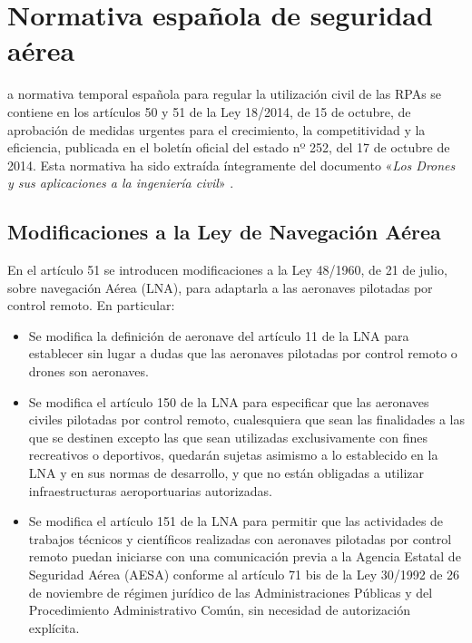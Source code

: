 \chapter{Normativa española de seguridad aérea}
\label{chap:normativa}

a normativa temporal española para regular la utilización civil de las \acs{RPA}s se contiene en los artículos 50 y 51 de la Ley 18/2014, de 15 de octubre, de aprobación de medidas urgentes para el crecimiento, la competitividad y la eficiencia, publicada en el boletín oficial del estado nº 252, del 17 de octubre de 2014. Esta normativa ha sido extraída íntegramente del documento «\textit{Los Drones y sus aplicaciones a la ingeniería civil}» \cite{normativa}.  

\section{Modificaciones a la Ley de Navegación Aérea}

En el artículo 51 se introducen modificaciones a la Ley 48/1960, de 21 de julio, sobre navegación Aérea (\acs{LNA}), para adaptarla a las aeronaves pilotadas por control remoto. En particular:

\begin{itemize}
\item Se modifica la definición de aeronave del artículo 11 de la \acs{LNA} para establecer sin lugar a dudas que las aeronaves pilotadas por control remoto o drones son aeronaves.
\item Se modifica el artículo 150 de la \acs{LNA} para especificar que las aeronaves civiles pilotadas por control remoto, cualesquiera que sean las finalidades a las que se destinen excepto las que sean utilizadas exclusivamente con fines recreativos o deportivos, quedarán sujetas asimismo a lo establecido en la \acs{LNA} y en sus normas de desarrollo, y que no están obligadas a utilizar infraestructuras aeroportuarias autorizadas.
\item Se modifica el artículo 151 de la \acs{LNA} para permitir que las actividades de trabajos técnicos y científicos realizadas
con aeronaves pilotadas por control remoto puedan iniciarse con una comunicación previa a la Agencia Estatal de Seguridad Aérea (AESA) conforme al artículo 71 bis de la Ley 30/1992 de 26 de noviembre de régimen jurídico de las Administraciones Públicas y del Procedimiento Administrativo Común, sin necesidad de autorización explícita.
\end{itemize}

